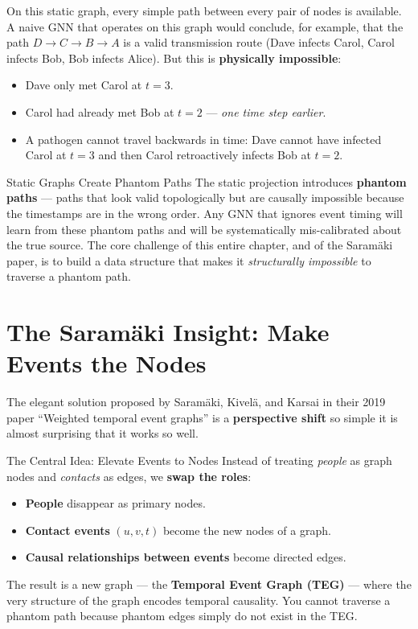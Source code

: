 On this static graph, every simple path between every pair of nodes is
available. A naive GNN that operates on this graph would conclude, for example,
that the path $D \to C \to B \to A$ is a valid transmission route (Dave infects
Carol, Carol infects Bob, Bob infects Alice). But this is \textbf{physically
impossible}:

\begin{itemize}
    \item Dave only met Carol at $t=3$.
    \item Carol had already met Bob at $t=2$ --- \emph{one time step earlier}.
    \item A pathogen cannot travel backwards in time: Dave cannot have infected
          Carol at $t=3$ and then Carol retroactively infects Bob at $t=2$.
\end{itemize}

\begin{keyinsight}{Static Graphs Create Phantom Paths}
The static projection introduces \textbf{phantom paths} --- paths that look
valid topologically but are causally impossible because the timestamps are
in the wrong order. Any GNN that ignores event timing will learn from these
phantom paths and will be systematically mis-calibrated about the true source.
The core challenge of this entire chapter, and of the Saram\"{a}ki paper, is
to build a data structure that makes it \emph{structurally impossible} to
traverse a phantom path.
\end{keyinsight}

\section{The Saram\"{a}ki Insight: Make Events the Nodes}
\label{sec:saramaki_insight}

The elegant solution proposed by Saram\"{a}ki, Kivel\"{a}, and Karsai in their
2019 paper ``Weighted temporal event graphs'' \cite{saramaki2019temporal} is a
\textbf{perspective shift} so simple it is almost surprising that it works so
well.

\begin{keyinsight}{The Central Idea: Elevate Events to Nodes}
Instead of treating \emph{people} as graph nodes and \emph{contacts} as edges,
we \textbf{swap the roles}:
\begin{itemize}[noitemsep]
    \item \textbf{People} disappear as primary nodes.
    \item \textbf{Contact events} $(u, v, t)$ become the new nodes of a graph.
    \item \textbf{Causal relationships between events} become directed edges.
\end{itemize}
The result is a new graph --- the \textbf{Temporal Event Graph (TEG)} --- where
the very structure of the graph encodes temporal causality. You cannot traverse
a phantom path because phantom edges simply do not exist in the TEG.
\end{keyinsight}


